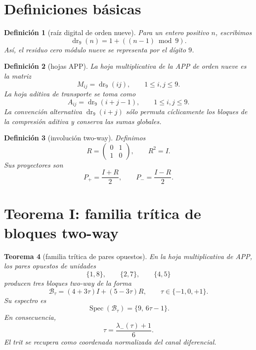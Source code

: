 \documentclass[11pt,a4paper]{article}
\newtheorem{teorema}{Teorema}
\newtheorem{definicion}[teorema]{Definici\'on}
\newcommand{\dr}{\operatorname{dr}_9}
\newcommand{\Spec}{\operatorname{Spec}}
\begin{document}
\section{Definiciones b\'asicas}

\begin{definicion}[ra\'iz digital de orden nueve]
Para un entero positivo \(n\), escribimos
\[
\dr(n)=1+((n-1)\bmod 9).
\]
As\'i, el residuo cero m\'odulo nueve se representa por el d\'igito \(9\).
\end{definicion}

\begin{definicion}[hojas APP]
La hoja multiplicativa de la APP de orden nueve es la matriz
\[
M_{ij}=\dr(ij),\qquad 1\le i,j\le 9.
\]
La hoja aditiva de transporte se toma como
\[
A_{ij}=\dr(i+j-1),\qquad 1\le i,j\le 9.
\]
La convenci\'on alternativa \(\dr(i+j)\) s\'olo permuta c\'iclicamente los bloques de la compresi\'on aditiva y conserva las sumas globales.
\end{definicion}

\begin{definicion}[involuci\'on two-way]
Definimos
\[
R=\begin{pmatrix}0&1\\1&0\end{pmatrix},\qquad R^2=I.
\]
Sus proyectores son
\[
P_+=\frac{I+R}{2},\qquad P_-=\frac{I-R}{2}.
\]
\end{definicion}

\section{Teorema I: familia tr\'itica de bloques two-way}

\begin{teorema}[familia tr\'itica de pares opuestos]
En la hoja multiplicativa de APP, los pares opuestos de unidades
\[
\{1,8\},\qquad \{2,7\},\qquad \{4,5\}
\]
producen tres bloques two-way de la forma
\[
\mathcal B_\tau=(4+3\tau)I+(5-3\tau)R,
\qquad \tau\in\{-1,0,+1\}.
\]
Su espectro es
\[
\boxed{\Spec(\mathcal B_\tau)=\{9,\,6\tau-1\}.}
\]
En consecuencia,
\[
\boxed{\tau=\frac{\lambda_-(\tau)+1}{6}.}
\]
El trit se recupera como coordenada normalizada del canal diferencial.
\end{teorema}
\end{document}
